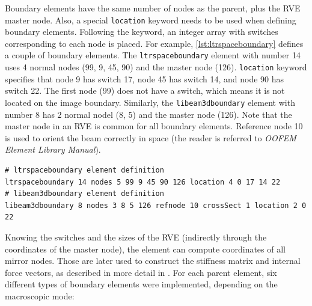 \documentclass[11pt]{article}
\begin{document}
Boundary elements have the same number of nodes as the parent, plus the RVE master node.
Also, a special \texttt{location} keyword needs to be used when defining boundary elements. Following the keyword, an integer array with switches corresponding to each node is placed. For example, \cref{lst:ltrspaceboundary}
defines a couple of boundary elements. The \texttt{ltrspaceboundary} element with number 14 uses 4 normal nodes (99, 9, 45, 90) and the master node (126). \texttt{location} keyword specifies that node 9 has switch 17, node 45 has switch 14, and node 90 has switch 22. The first node (99) does not have a switch, which means it is not located on the image boundary. 
Similarly, the \texttt{libeam3dboundary} element with number 8 has 2 normal nodel (8, 5) and the master node (126). Note that the master node in an RVE is common for all boundary elements. Reference node 10 is used to orient the beam correctly in space (the reader is referred to \textit{OOFEM Element Library Manual}).

\begin{lstlisting}[style=oofem, language=oofeminput, caption={Example of boundary elements definition}, label=lst:ltrspaceboundary]
# ltrspaceboundary element definition
ltrspaceboundary 14 nodes 5 99 9 45 90 126 location 4 0 17 14 22
# libeam3dboundary element definition
libeam3dboundary 8 nodes 3 8 5 126 refnode 10 crossSect 1 location 2 0 22
\end{lstlisting}



Knowing the switches and the sizes of the RVE (indirectly through the coordinates of the master node), the element can compute coordinates of all mirror nodes. Those are later used to construct the stiffness matrix and internal force vectors, as described in more detail in \cite{PaperE}.
For each parent element, six different types of boundary elements were implemented, depending on the macroscopic mode:
\end{document}
